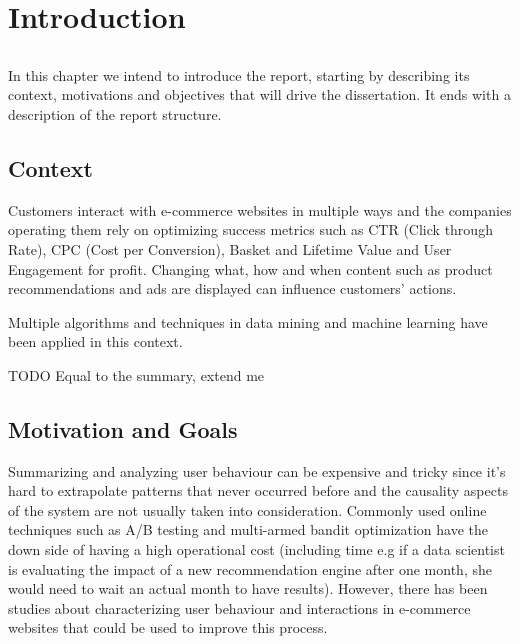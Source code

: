 \chapter{Introduction} \label{chap:intro}

\section*{}

In this chapter we intend to introduce the report, starting by describing its 
context, motivations and objectives that will drive the dissertation. It ends 
with a description of the report structure.


\section{Context} \label{sec:context}
 

Customers interact with e-commerce websites in multiple ways and the companies
operating them rely on optimizing success metrics such as CTR (Click
through Rate), CPC (Cost per Conversion), Basket and Lifetime Value and User
Engagement for profit. Changing what, how and when content such as product
recommendations and ads are displayed can influence customers’ actions.

Multiple algorithms and techniques in data mining and machine learning
have been applied in this context.

TODO Equal to the summary, extend me

\section{Motivation and Goals} \label{sec:goals}

Summarizing and analyzing user behaviour can be expensive and tricky since it’s 
hard to extrapolate patterns that never occurred before and the causality 
aspects of the system are not usually taken into consideration. Commonly used 
online techniques such as A/B testing and multi-armed bandit optimization have 
the down side of having a high operational cost (including time e.g if a data 
scientist is evaluating the impact of a new recommendation engine after one 
month, she would need to wait an actual month to have results). However, there 
has been studies about characterizing user behaviour and interactions in 
e-commerce websites that could be used to improve this process.

